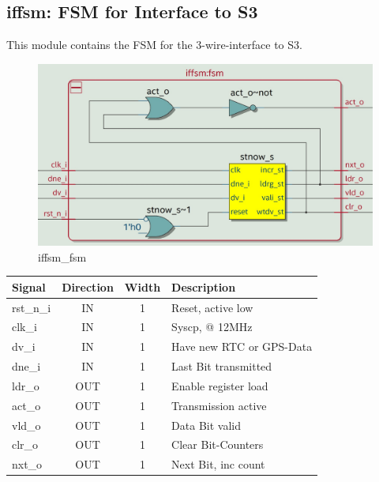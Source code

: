\documentclass[12pt,a4 paper] {report}
\begin{document}
\subsection{iffsm: FSM for Interface to S3}
This module contains the FSM for the 3-wire-interface to S3.
\begin{figure}[h]
	\centering	
	\includegraphics[scale=0.2]{../png/iffsm_fsm.png}
	\caption{iffsm\_fsm}
\end{figure}
\begin{center}
	\begin{tabular}{ | p{2cm} | c | c | p{5cm} |}
		\hline
		\textbf{Signal} & \textbf{Direction} & \textbf{Width} & \textbf{Description} \\
		\hline
		rst\_n\_i & IN & 1 & Reset, active low \\
		\hline
		clk\_i & IN & 1 & Syscp, @ 12MHz \\
		\hline
		dv\_i & IN & 1 & Have new RTC or GPS-Data \\
		\hline
		dne\_i & IN & 1 & Last Bit transmitted \\
		\hline
		ldr\_o & OUT & 1 & Enable register load \\
		\hline
		act\_o & OUT & 1 & Transmission active \\
		\hline
		vld\_o & OUT & 1 & Data Bit valid \\
		\hline
		clr\_o & OUT & 1 & Clear Bit-Counters \\
		\hline
		nxt\_o & OUT & 1 & Next Bit, inc count \\
		\hline
	\end{tabular}
\end{center}

\newpage
\end{document}
